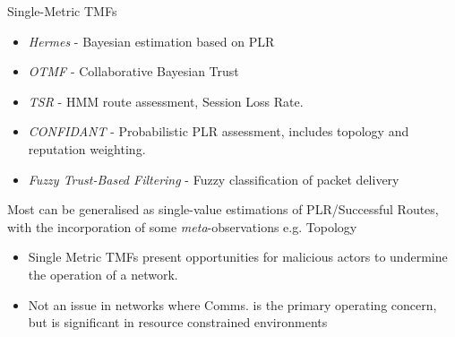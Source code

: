 \documentclass{beamer}
\begin{document}
\begin{frame}[allowframebreaks]{Single-Metric TMFs}
  \begin{itemize}
    \item \emph{Hermes} \autocite{Zouridaki2005} - Bayesian estimation based on PLR
    \item \emph{OTMF} \autocite{Li2008} - Collaborative Bayesian Trust
    \item \emph{TSR} \autocite{Moe2008a} - HMM route assessment, Session Loss Rate.
    \item \emph{CONFIDANT} \autocite{Buchegger2002} - Probabilistic PLR assessment, includes topology and reputation weighting.
    \item \emph{Fuzzy Trust-Based Filtering} \autocite{Luo2008} - Fuzzy classification of packet delivery
  \end{itemize}
  Most can be generalised as single-value estimations of PLR/Successful Routes, with the incorporation of some \emph{meta}-observations e.g. Topology
  \framebreak
  \begin{itemize}
  \item
    Single Metric TMFs present opportunities for malicious actors to undermine the operation of a network. 
  \item 
    Not an issue in networks where Comms. is the primary operating concern, but is significant in resource constrained environments
  \end{itemize}

\end{frame}
\end{document}
